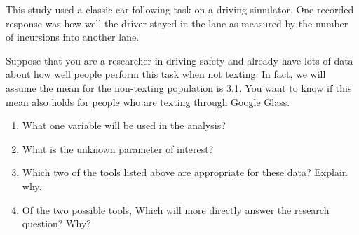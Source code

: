 \begin{list}{}{}
\begin{list}{}{}
    This study used a classic car following task on a driving
    simulator. One recorded response was how well the driver stayed in
    the lane as measured by the number of incursions into another lane.
  \end{list}
  Suppose that you are a researcher in driving safety and already have
  lots of data about how well people perform this task when not
  texting. In fact, we will assume the mean for the non-texting
  population is 3.1.  You want to know if this mean also holds for
  people who are texting through Google Glass.
   \begin{enumerate}
   \item What one variable will be used in the analysis?\vspace{1cm}
   \item What is the unknown parameter of interest?\vspace{1cm}
   \item Which two of the tools listed above are appropriate for these
     data? Explain why.\vspace{2cm}
   \item Of the two possible tools, Which will more directly answer
     the research question? Why? \vspace{1cm}
  \end{enumerate}

\end{list}






